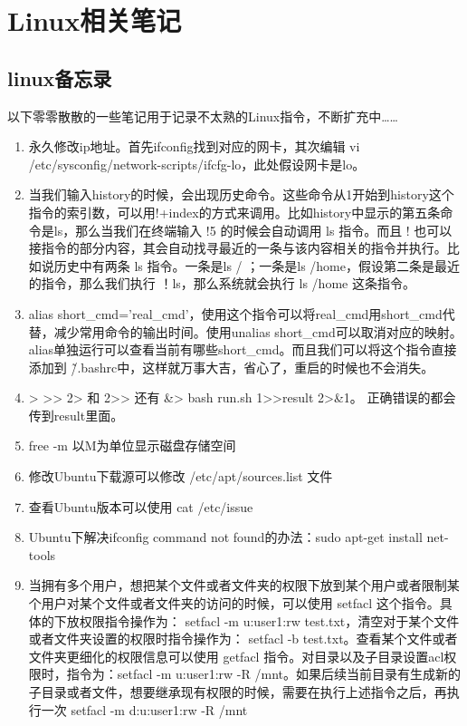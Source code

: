 \chapter{Linux相关笔记}

\section{linux备忘录}

以下零零散散的一些笔记用于记录不太熟的Linux指令，不断扩充中……
\begin{enumerate}
  \item 永久修改ip地址。首先ifconfig找到对应的网卡，其次编辑 vi /etc/sysconfig/network-scripts/ifcfg-lo，此处假设网卡是lo。
  \item 当我们输入history的时候，会出现历史命令。这些命令从1开始到history这个指令的索引数，可以用!+index的方式来调用。比如history中显示的第五条命令是ls，那么当我们在终端输入 !5 的时候会自动调用 ls 指令。而且 ! 也可以接指令的部分内容，其会自动找寻最近的一条与该内容相关的指令并执行。比如说历史中有两条 ls 指令。一条是ls / ；一条是ls /home，假设第二条是最近的指令，那么我们执行 ！ls，那么系统就会执行 ls /home 这条指令。
  \item alias short\_cmd='real\_cmd'，使用这个指令可以将real\_cmd用short\_cmd代替，减少常用命令的输出时间。使用unalias short\_cmd可以取消对应的映射。alias单独运行可以查看当前有哪些short\_cmd。而且我们可以将这个指令直接添加到 \~/.bashrc中，这样就万事大吉，省心了，重启的时候也不会消失。
  \item > >> 2> 和 2>> 还有 &>  bash run.sh 1>>result 2>&1。 正确错误的都会传到result里面。
  \item free -m 以M为单位显示磁盘存储空间
  \item 修改Ubuntu下载源可以修改 /etc/apt/sources.list 文件
  \item 查看Ubuntu版本可以使用 cat /etc/issue
  \item Ubuntu下解决ifconfig command not found的办法：sudo apt-get install net-tools
  \item 当拥有多个用户，想把某个文件或者文件夹的权限下放到某个用户或者限制某个用户对某个文件或者文件夹的访问的时候，可以使用 setfacl 这个指令。具体的下放权限指令操作为： setfacl -m u:user1:rw test.txt，清空对于某个文件或者文件夹设置的权限时指令操作为： setfacl -b  test.txt。查看某个文件或者文件夹更细化的权限信息可以使用 getfacl 指令。对目录以及子目录设置acl权限时，指令为：setfacl -m u:user1:rw -R /mnt。如果后续当前目录有生成新的子目录或者文件，想要继承现有权限的时候，需要在执行上述指令之后，再执行一次 setfacl -m d:u:user1:rw -R /mnt

\end{enumerate}
